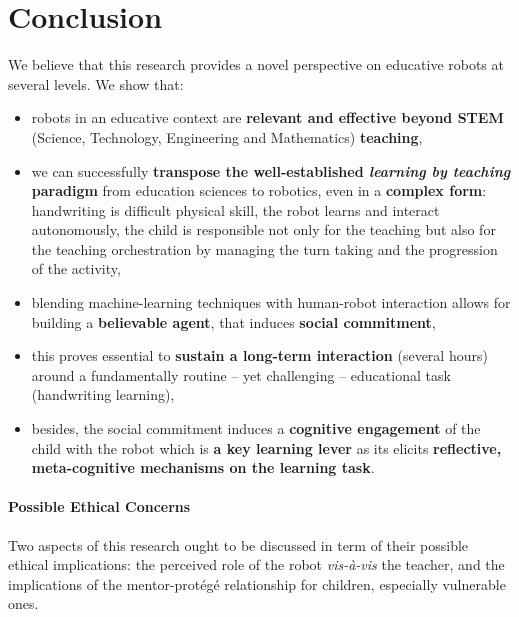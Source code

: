 \documentclass{article}
\begin{document}
\section{Conclusion}

We believe that this research provides a novel perspective on educative
robots at several levels. We show that:

\begin{itemize}
    \item robots in an educative context are \textbf{relevant and effective
        beyond STEM} (Science, Technology, Engineering and Mathematics)
    \textbf{teaching},

    \item we can successfully \textbf{transpose the well-established
        \emph{learning by teaching} paradigm} from education sciences to
        robotics, even in a \textbf{complex form}: handwriting is difficult
        physical skill, the robot learns and interact autonomously, the child is
        responsible not only for the teaching but also for the teaching
        orchestration by managing the turn taking and the progression of the
        activity,

    \item blending machine-learning techniques with human-robot interaction
        allows for building a \textbf{believable agent}, that induces
        \textbf{social commitment},

    \item this proves essential to \textbf{sustain a long-term interaction} (several
        hours) around a fundamentally routine -- yet challenging -- educational
        task (handwriting learning),

    \item besides, the social commitment induces a \textbf{cognitive engagement}
        of the child with the robot which is \textbf{a key learning lever} as
        its elicits \textbf{reflective, meta-cognitive mechanisms on the
        learning task}.
\end{itemize}

\paragraph{Possible Ethical Concerns} Two aspects of this research ought to be
discussed in term of their possible ethical implications: the perceived role of
the robot \textit{vis-à-vis} the teacher, and the implications of the
mentor-protégé relationship for children, especially vulnerable ones.
\end{document}

